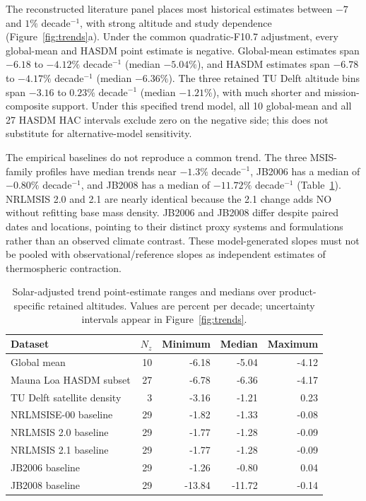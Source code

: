 \documentclass[11pt]{article}
\begin{document}
The reconstructed literature panel places most historical estimates between
$-7$ and $1\%$ decade$^{-1}$, with strong altitude and study dependence
(Figure~\ref{fig:trends}a).  Under the common quadratic-F10.7 adjustment, every
global-mean and HASDM point estimate is negative.  Global-mean estimates span
$-6.18$ to $-4.12\%$ decade$^{-1}$ (median $-5.04\%$), and HASDM estimates span
$-6.78$ to $-4.17\%$ decade$^{-1}$ (median $-6.36\%$).  The three retained TU
Delft altitude bins span $-3.16$ to $0.23\%$ decade$^{-1}$ (median $-1.21\%$),
with much shorter and mission-composite support.  Under this specified trend
model, all 10 global-mean and all 27 HASDM HAC intervals exclude zero on the
negative side; this does not substitute for alternative-model sensitivity.

The empirical baselines do not reproduce a common trend.  The three MSIS-family
profiles have median trends near $-1.3\%$ decade$^{-1}$, JB2006 has a median of
$-0.80\%$ decade$^{-1}$, and JB2008 has a median of
$-11.72\%$ decade$^{-1}$ (Table~\ref{tab:trends}).  NRLMSIS 2.0 and 2.1 are
nearly identical because the 2.1 change adds NO without refitting base mass
density.  JB2006 and JB2008 differ despite paired dates and locations, pointing
to their distinct proxy systems and formulations rather than an observed
climate contrast.  These model-generated slopes must not be pooled with
observational/reference slopes as independent estimates of thermospheric
contraction.

\begin{table}[t]
\centering
\caption{Solar-adjusted trend point-estimate ranges and medians over
product-specific retained altitudes.  Values are percent per decade;
uncertainty intervals appear in Figure~\ref{fig:trends}.}
\label{tab:trends}
\begin{tabular}{lrrrr}
\toprule
Dataset & $N_z$ & Minimum & Median & Maximum \\
\midrule
Global mean & 10 & -6.18 & -5.04 & -4.12 \\
Mauna Loa HASDM subset & 27 & -6.78 & -6.36 & -4.17 \\
TU Delft satellite density & 3 & -3.16 & -1.21 & 0.23 \\
NRLMSISE-00 baseline & 29 & -1.82 & -1.33 & -0.08 \\
NRLMSIS 2.0 baseline & 29 & -1.77 & -1.28 & -0.09 \\
NRLMSIS 2.1 baseline & 29 & -1.77 & -1.28 & -0.09 \\
JB2006 baseline & 29 & -1.26 & -0.80 & 0.04 \\
JB2008 baseline & 29 & -13.84 & -11.72 & -0.14 \\
\bottomrule
\end{tabular}
\end{table}
\end{document}
